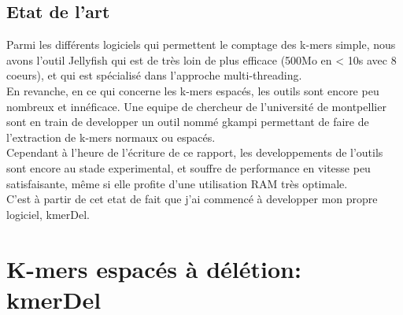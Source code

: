 \documentclass{report}
\begin{document}
    \section{Etat de l'art}
      Parmi les différents logiciels qui permettent le comptage des k-mers simple, nous avons l'outil Jellyfish \cite{Marcais2011} qui est de très loin de plus efficace (500Mo en < 10s avec 8 coeurs), et qui est spécialisé dans l'approche multi-threading.\\
      En revanche, en ce qui concerne les k-mers espacés, les outils sont encore peu nombreux et innéficace.
      Une equipe de chercheur de l'université de montpellier sont en train de developper un outil nommé gkampi permettant de faire de l'extraction de k-mers normaux ou espacés.\\
      Cependant à l'heure de l'écriture de ce rapport, les developpements de l'outils sont encore au stade experimental, et souffre de performance en vitesse peu satisfaisante, même si elle profite d'une utilisation RAM très optimale.\\
      C'est à partir de cet etat de fait que j'ai commencé à developper mon propre logiciel, kmerDel.

  \chapter{K-mers espacés à délétion: kmerDel}
\end{document}
